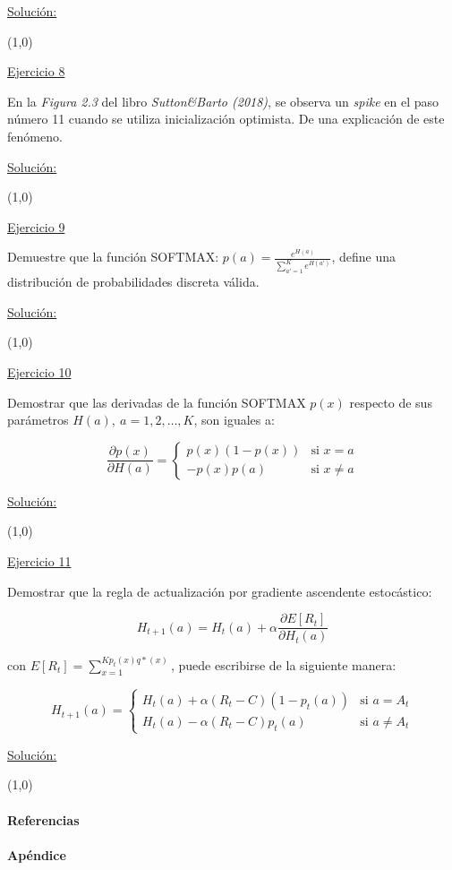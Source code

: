 \documentclass[12pt]{article}
\newlength\tindent
\renewcommand{\indent}{\hspace*{\tindent}}
\begin{document}
    \indent\underline{Solución:}

    \lipsum[2]

    \line(1,0){\textwidth}

    \indent\underline{Ejercicio 8}

    En la \textit{Figura 2.3} del libro \textit{Sutton\&Barto (2018)}, se observa un \textit{spike} en el paso número 11 cuando se utiliza inicialización optimista.
    De una explicación de este fenómeno.

    \indent\underline{Solución:}

    \lipsum[2]

    \line(1,0){\textwidth}

    \indent\underline{Ejercicio 9}

    Demuestre que la función SOFTMAX: $p(a)=\frac{e^{H(a)}}{\sum_{a'=1}^{K} e^{H(a')}}$, define una distribución de probabilidades discreta válida.

    \indent\underline{Solución:}

    \lipsum[2]

    \line(1,0){\textwidth}

    \indent\underline{Ejercicio 10}

    Demostrar que las derivadas de la función SOFTMAX $p(x)$ respecto de sus parámetros $H(a),\ a=1,2,\dots,K$, son iguales a:

    \[
        \frac{\partial p(x)}{\partial H(a)} =
        \begin{cases}
            p(x)(1-p(x))    &\text{si $x = a$} \\
            -p(x)p(a)       &\text{si $x\neq a$}
        \end{cases}
    \]

    \indent\underline{Solución:}

    \lipsum[2]

    \line(1,0){\textwidth}

    \indent\underline{Ejercicio 11}

    Demostrar que la regla de actualización por gradiente ascendente estocástico:

    \[H_{t+1}(a) = H_t (a) + \alpha \frac{\partial E[R_t] }{\partial H_t(a)}\]

    con $E[R_t] = \sum_{x=1}^{K p_t(x)q*(x)}$, puede escribirse de la siguiente manera:

    \[
        H_{t+1}(a) =
        \begin{cases}
            H_t (a) + \alpha (R_t - C)(1-p_t(a))    &\text{si $a = A_t$} \\
            H_t (a) - \alpha (R_t - C)p_t(a)        &\text{si $a \neq A_t$}
        \end{cases}
    \]

    \indent\underline{Solución:}

    \lipsum[5]

    \line(1,0){\textwidth}

    \paragraph{Referencias}\label{sec:references}
    \lipsum[5]

    \paragraph{Apéndice}\label{sec:appendix}

    \lipsum[5]
\end{document}
